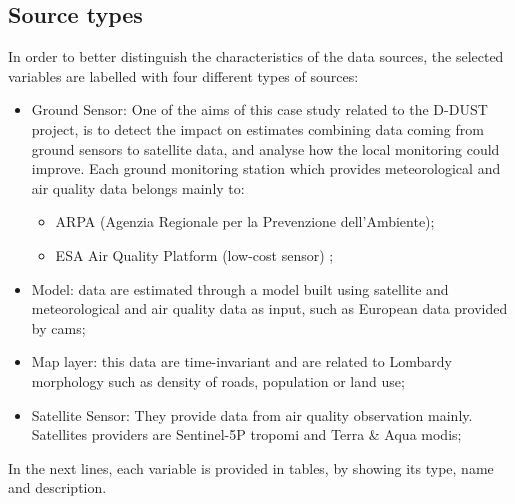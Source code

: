 \subsection{Source types}
In order to better distinguish the characteristics of the data sources, the selected variables are labelled with four different types of sources:
\begin{itemize}

\item Ground Sensor: One of the aims of this case study related to the D-DUST project, is to detect the impact on estimates combining data coming from ground sensors to satellite data, and analyse how the local monitoring could improve.  
Each ground monitoring station which provides meteorological and air quality data belongs mainly to: 
\begin{itemize}
    \item ARPA (Agenzia Regionale per la Prevenzione dell'Ambiente);
    \item ESA Air Quality Platform (low-cost sensor) \cite{esasensor};
\end{itemize} 

\item Model: data are estimated through a model built using satellite and meteorological and air quality data as input, such as European data provided by \acrshort{cams};
\item Map layer: this data are time-invariant and are related to Lombardy morphology such as density of roads, population or land use; 
\item Satellite Sensor: They provide data from air quality observation mainly. Satellites providers are Sentinel-5P \acrshort{tropomi} and Terra \& Aqua \acrshort{modis};
\end{itemize}
\bigbreak

In the next lines, each variable is provided in tables, by showing its type, name and description.
\pagebreak
